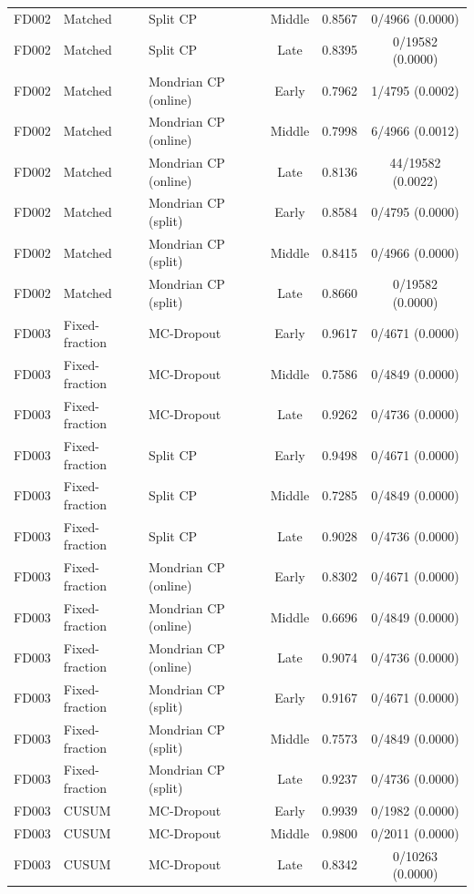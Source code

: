 \begin{table}[t]
\begin{tabular}{lllccc}
FD002 & Matched & Split CP & Middle & 0.8567 & 0/4966 (0.0000) \\
FD002 & Matched & Split CP & Late & 0.8395 & 0/19582 (0.0000) \\
FD002 & Matched & Mondrian CP (online) & Early & 0.7962 & 1/4795 (0.0002) \\
FD002 & Matched & Mondrian CP (online) & Middle & 0.7998 & 6/4966 (0.0012) \\
FD002 & Matched & Mondrian CP (online) & Late & 0.8136 & 44/19582 (0.0022) \\
FD002 & Matched & Mondrian CP (split) & Early & 0.8584 & 0/4795 (0.0000) \\
FD002 & Matched & Mondrian CP (split) & Middle & 0.8415 & 0/4966 (0.0000) \\
FD002 & Matched & Mondrian CP (split) & Late & 0.8660 & 0/19582 (0.0000) \\
FD003 & Fixed-fraction & MC-Dropout & Early & 0.9617 & 0/4671 (0.0000) \\
FD003 & Fixed-fraction & MC-Dropout & Middle & 0.7586 & 0/4849 (0.0000) \\
FD003 & Fixed-fraction & MC-Dropout & Late & 0.9262 & 0/4736 (0.0000) \\
FD003 & Fixed-fraction & Split CP & Early & 0.9498 & 0/4671 (0.0000) \\
FD003 & Fixed-fraction & Split CP & Middle & 0.7285 & 0/4849 (0.0000) \\
FD003 & Fixed-fraction & Split CP & Late & 0.9028 & 0/4736 (0.0000) \\
FD003 & Fixed-fraction & Mondrian CP (online) & Early & 0.8302 & 0/4671 (0.0000) \\
FD003 & Fixed-fraction & Mondrian CP (online) & Middle & 0.6696 & 0/4849 (0.0000) \\
FD003 & Fixed-fraction & Mondrian CP (online) & Late & 0.9074 & 0/4736 (0.0000) \\
FD003 & Fixed-fraction & Mondrian CP (split) & Early & 0.9167 & 0/4671 (0.0000) \\
FD003 & Fixed-fraction & Mondrian CP (split) & Middle & 0.7573 & 0/4849 (0.0000) \\
FD003 & Fixed-fraction & Mondrian CP (split) & Late & 0.9237 & 0/4736 (0.0000) \\
FD003 & CUSUM & MC-Dropout & Early & 0.9939 & 0/1982 (0.0000) \\
FD003 & CUSUM & MC-Dropout & Middle & 0.9800 & 0/2011 (0.0000) \\
FD003 & CUSUM & MC-Dropout & Late & 0.8342 & 0/10263 (0.0000) \\

\end{tabular}
\end{table}
